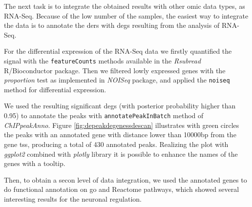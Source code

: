 The next task is to integrate the obtained results with other omic data types, as RNA-Seq. 
Because of the low number of the samples, the easiest way to integrate the data is to annotate the \glspl{der} with \glspl{deg} resulting from the analysis of RNA-Seq.

For the differential expression of the RNA-Seq data we firstly quantified the signal with the \lstinline!featureCounts! methods available in the \textit{Rsubread} \cite{Liao2013} R/Bioconductor package.
Then we filtered lowly expressed genes with the \textit{proportion} test  as implemented in \textit{NOISeq} package, and applied the \lstinline!noiseq! method for differential expression.

We used the resulting significant \glspl{deg} (with posterior probability higher than 0.95) to annotate the peaks with \lstinline!annotatePeakInBatch! method of \textit{ChIPpeakAnno}.
Figure 	\ref{fig:depeakdegenessdescan} illustrates with green circles the peaks with an annotated gene with distance lower than 10000bp from the gene \gls{tss}, producing a total of 430 annotated peaks.
Realizing the plot with \textit{ggplot2} combined with \textit{plotly} library it is possible to enhance the names of the genes with a tooltip.

Then, to obtain a secon level of data integration, we used the annotated genes to do functional annotation on \gls{go} \cite{GeneOntologyConsortium2004, GeneOntologyConsortium2015} and Reactome pathways, which showed several interesting results for the neuronal regulation.








